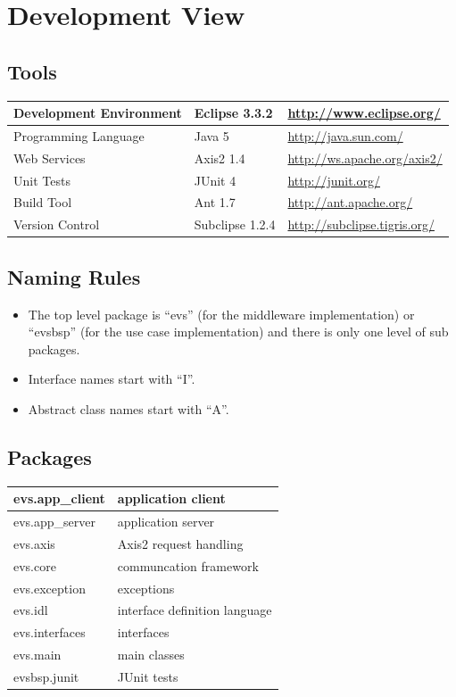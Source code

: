 \documentclass[a4paper]{article}
\begin{document}


\section{Development View}

\subsection{Tools}

	\begin{tabular}{|l|l|l|}
	\hline
	Development Environment & Eclipse 3.3.2 & \url{http://www.eclipse.org/}\\
	\hline
	Programming Language & Java 5 & \url{http://java.sun.com/}\\
	\hline
	Web Services & Axis2 1.4 & \url{http://ws.apache.org/axis2/}\\
	\hline
	Unit Tests & JUnit 4 & \url{http://junit.org/}\\
	\hline
	Build Tool & Ant 1.7 & \url{http://ant.apache.org/}\\
	\hline
	Version Control & Subclipse 1.2.4 & \url{http://subclipse.tigris.org/}\\
	\hline
	\end{tabular}

\subsection{Naming Rules}

\begin{itemize}
\item The top level package is ``evs'' (for the middleware implementation) or ``evsbsp'' (for the use case implementation) and there is only one level of sub packages.
\item Interface names start with ``I''.
\item Abstract class names start with ``A''.
\end{itemize}

\subsection{Packages}

	\begin{tabular}{|l|l|}
	\hline
	evs.app\_client & application client\\
	\hline
	evs.app\_server & application server\\
	\hline
	evs.axis & Axis2 request handling\\
	\hline
	evs.core & communcation framework\\
	\hline
	evs.exception & exceptions\\
	\hline
	evs.idl & interface definition language\\
	\hline
	evs.interfaces & interfaces\\
	\hline
	evs.main & main classes\\
	\hline
	evsbsp.junit & JUnit tests\\
	\hline
	\end{tabular}
\end{document}
